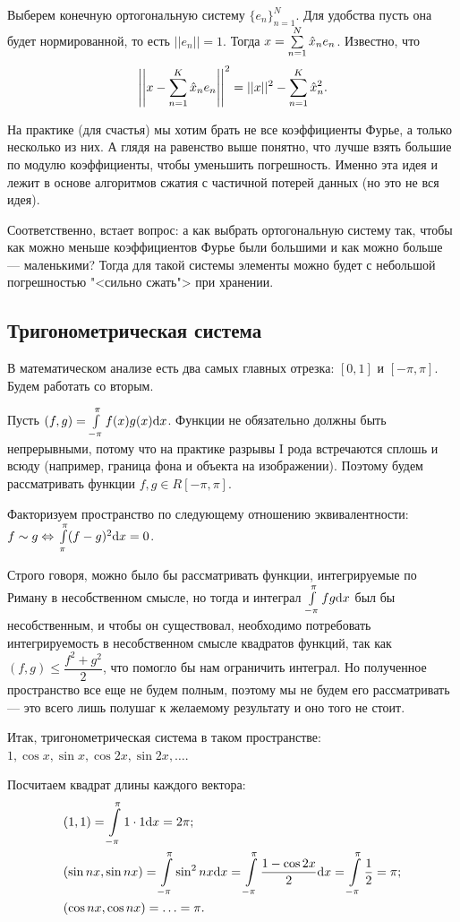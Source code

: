 Выберем конечную ортогональную систему $\{e_n\}_{n=1}^N$. Для удобства пусть она будет нормированной, то есть $||e_n|| = 1$. Тогда $x = \sum\limits_{n = 1}^{N} \hat{x}_ne_n$. Известно, что 
$$\left|\left|x - \sum\limits_{n=1}^{K}\hat{x}_ne_n\right|\right|^2 = ||x||^2 - \sum\limits_{n=1}^{K}\hat{x}_n^2.$$

На практике (для счастья) мы хотим брать не все коэффициенты Фурье, а только несколько из них. А глядя на равенство выше понятно, что лучше взять большие по модулю коэффициенты, чтобы уменьшить погрешность. Именно эта идея и лежит в основе алгоритмов сжатия с частичной потерей данных (но это не вся идея).

Соответственно, встает вопрос: а как выбрать ортогональную систему так, чтобы как можно меньше коэффициентов Фурье были большими и как можно больше --- маленькими? Тогда для такой системы элементы можно будет с небольшой погрешностью "<сильно сжать"> при хранении.

\subsection{Тригонометрическая система}
В математическом анализе есть два самых главных отрезка: $[0, 1]$ и $[-\pi, \pi]$. Будем работать со вторым.

Пусть $(f, g) = \int\limits_{-\pi}^{\pi} f(x)g(x) \mathrm{d} x$. Функции не обязательно должны быть непрерывными, потому что на практике разрывы I рода встречаются сплошь и всюду (например, граница фона и объекта на изображении). Поэтому будем рассматривать функции $f, g \in R[-\pi, \pi]$.

Факторизуем пространство по следующему отношению эквивалентности: $f \sim g \Leftrightarrow \\ \int\limits_{\pi}^{\pi}(f - g)^2 \mathrm{d} x = 0$. 

Строго говоря, можно было бы рассматривать функции, интегрируемые по Риману в несобственном смысле, но тогда и интеграл $\int\limits_{-\pi}^{\pi}fg \mathrm{d} x$ был бы несобственным, и чтобы он существовал, необходимо потребовать интегрируемость в несобственном смысле квадратов функций, так как $(f, g) \leq \dfrac{f^2 + g^2}{2}$, что помогло бы нам ограничить интеграл. Но полученное пространство все еще не будем полным, поэтому мы не будем его рассматривать --- это всего лишь полушаг к желаемому результату и оно того не стоит.

Итак, тригонометрическая система в таком пространстве: $1, \cos x, \sin x, \cos 2x, \sin 2x, \ldots$.

Посчитаем квадрат длины каждого вектора:
\begin{align*}
&(1, 1) =  \int\limits_{-\pi}^{\pi} 1 \cdot 1 \mathrm{d} x = 2\pi;\\
&(\sin nx, \sin nx) =  \int\limits_{-\pi}^{\pi} \sin^2 nx \mathrm{d} x =  \int\limits_{-\pi}^{\pi} \frac{1 - \cos 2x}{2} \mathrm{d} x =  \int\limits_{-\pi}^{\pi} \dfrac{1}{2} = \pi;\\
&(\cos nx, \cos nx) = \ldots = \pi.
\end{align*}

